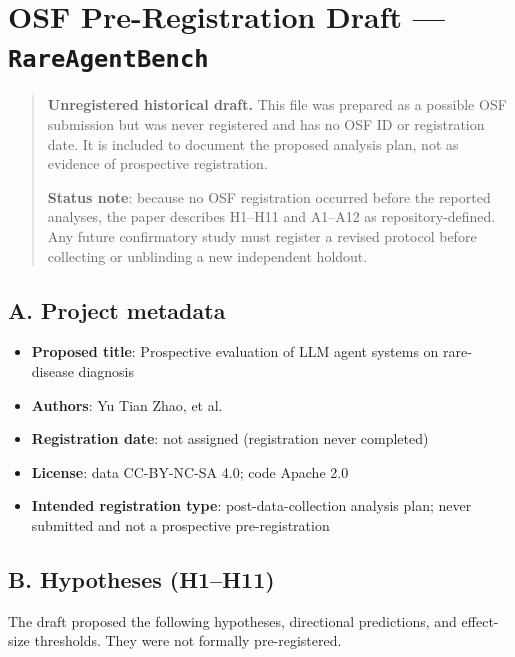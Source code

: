 \section{\texorpdfstring{OSF Pre-Registration Draft --- \texttt{RareAgentBench}}{OSF Pre-Registration Draft --- RareAgentBench}}\label{osf-pre-registration-draft-rareagentbench}

\begin{quote}
\textbf{Unregistered historical draft.} This file was prepared as a possible
OSF submission but was never registered and has no OSF ID or registration date.
It is included to document the proposed analysis plan, not as evidence of
prospective registration.

\textbf{Status note}: because no OSF registration occurred before the reported
analyses, the paper describes H1--H11 and A1--A12 as repository-defined.
Any future confirmatory study must register a revised protocol before
collecting or unblinding a new independent holdout.
\end{quote}

\subsection{A. Project metadata}\label{a.-project-metadata}

\begin{itemize}
\tightlist
\item
  \textbf{Proposed title}: Prospective evaluation of LLM agent systems on rare-disease
  diagnosis
\item
  \textbf{Authors}: Yu Tian Zhao, et al.
\item
  \textbf{Registration date}: not assigned (registration never completed)
\item
  \textbf{License}: data CC-BY-NC-SA 4.0; code Apache 2.0
\item
  \textbf{Intended registration type}: post-data-collection analysis plan; never
  submitted and not a prospective pre-registration
\end{itemize}

\subsection{B. Hypotheses (H1--H11)}\label{b.-hypotheses-h1h11}

The draft proposed the following hypotheses, directional predictions, and
effect-size thresholds. They were not formally pre-registered.

